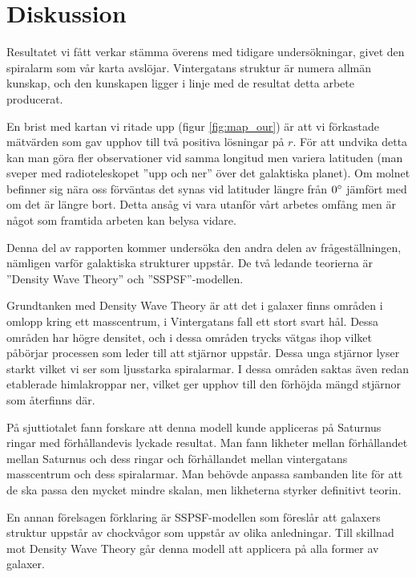 \chapter{Diskussion}
Resultatet vi fått verkar stämma överens med tidigare undersökningar, givet den spiralarm som vår karta avslöjar. Vintergatans struktur är numera allmän kunskap, och den kunskapen ligger i linje med de resultat detta arbete producerat\autocite{chalmers:samma_arbete}.

En brist med kartan vi ritade upp (figur \ref{fig:map_our}) är att vi förkastade mätvärden som gav upphov till två positiva lösningar på $r$. För att undvika detta kan man göra fler observationer vid samma longitud men variera latituden (man sveper med radioteleskopet ''upp och ner'' över det galaktiska planet). Om molnet befinner sig nära oss förväntas det synas vid latituder längre från $0\degree$ jämfört med om det är längre bort. Detta ansåg vi vara utanför vårt arbetes omfång men är något som framtida arbeten kan belysa vidare.

Denna del av rapporten kommer undersöka den andra delen av frågeställningen, nämligen varför galaktiska strukturer uppstår. De två ledande teorierna är ''Density Wave Theory'' och ''SSPSF''-modellen.

Grundtanken med Density Wave Theory\autocite{swin.edu:density-wave} är att det i galaxer finns områden i omlopp kring ett masscentrum, i Vintergatans fall ett stort svart hål. Dessa områden har högre densitet, och i dessa områden trycks vätgas ihop vilket påbörjar processen som leder till att stjärnor uppstår. Dessa unga stjärnor lyser starkt vilket vi ser som ljusstarka spiralarmar. I dessa områden saktas även redan etablerade himlakroppar ner, vilket ger upphov till den förhöjda mängd stjärnor som återfinns där. 

På sjuttiotalet fann forskare att denna modell kunde appliceras på Saturnus ringar med förhållandevis lyckade resultat\autocite{wikipedia:density-wave}. Man fann likheter mellan förhållandet mellan Saturnus och dess ringar och förhållandet mellan vintergatans masscentrum och dess spiralarmar. Man behövde anpassa sambanden lite för att de ska passa den mycket mindre skalan, men likheterna styrker definitivt teorin.

En annan förelsagen förklaring är SSPSF-modellen \autocite{caltech:sspsf} som föreslår att galaxers struktur uppstår av chockvågor som uppstår av olika anledningar. Till skillnad mot Density Wave Theory går denna modell att applicera på alla former av galaxer.

